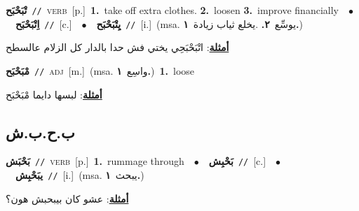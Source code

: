 \documentclass[10pt,a4paper,twoside]{article} %
\begin{document}
\begin{multicols}{2}
{\setlength\topsep{0pt}\textbf{\foreignlanguage{arabic}{تْبَحْبَح}}\ {\color{gray}\texttt{//}\color{black}}\ \textsc{verb}\ [p.]\ \textbf{1.}~take off extra clothes.  \textbf{2.}~loosen  \textbf{3.}~improve financially\ \ $\bullet$\ \ \setlength\topsep{0pt}\textbf{\foreignlanguage{arabic}{اِتْبَحْبَح}}\ {\color{gray}\texttt{//}\color{black}}\ [c.]\ \ $\bullet$\ \ \setlength\topsep{0pt}\textbf{\foreignlanguage{arabic}{يِتْبَحْبَح}}\ {\color{gray}\texttt{//}\color{black}}\ [i.]\ \color{gray}(msa. \foreignlanguage{arabic}{يوسِّع}~\foreignlanguage{arabic}{\textbf{٢.}}  .\foreignlanguage{arabic}{يخلع ثياب زيادة}~\foreignlanguage{arabic}{\textbf{١.}})\color{black}\  \begin{flushright}\color{gray}\foreignlanguage{arabic}{\textbf{\underline{\foreignlanguage{arabic}{أمثلة}}}: اتْبَحْبَحِي يختي فش حدا بالدار كل الزلام عالسطح}\end{flushright}\color{black}} \vspace{2mm}

{\setlength\topsep{0pt}\textbf{\foreignlanguage{arabic}{مْبَحْبَح}}\ {\color{gray}\texttt{//}\color{black}}\ \textsc{adj}\ [m.]\ \color{gray}(msa. \foreignlanguage{arabic}{واسِع}~\foreignlanguage{arabic}{\textbf{١.}})\color{black}\ \textbf{1.}~loose\  \begin{flushright}\color{gray}\foreignlanguage{arabic}{\textbf{\underline{\foreignlanguage{arabic}{أمثلة}}}: لبسها دايما مْبَحْبَح}\end{flushright}\color{black}} \vspace{2mm}

\vspace{-3mm}
\subsection*{\color{blue}\foreignlanguage{arabic}{ب.ح.ب.ش}\color{blue}{}} 

{\setlength\topsep{0pt}\textbf{\foreignlanguage{arabic}{بَحْبَش}}\ {\color{gray}\texttt{//}\color{black}}\ \textsc{verb}\ [p.]\ \textbf{1.}~rummage through\ \ $\bullet$\ \ \setlength\topsep{0pt}\textbf{\foreignlanguage{arabic}{بَحْبِش}}\ {\color{gray}\texttt{//}\color{black}}\ [c.]\ \ $\bullet$\ \ \setlength\topsep{0pt}\textbf{\foreignlanguage{arabic}{يبَحْبِش}}\ {\color{gray}\texttt{//}\color{black}}\ [i.]\ \color{gray}(msa. \foreignlanguage{arabic}{يبحث}~\foreignlanguage{arabic}{\textbf{١.}})\color{black}\  \begin{flushright}\color{gray}\foreignlanguage{arabic}{\textbf{\underline{\foreignlanguage{arabic}{أمثلة}}}: عشو كان بيبحبش هون؟}\end{flushright}\color{black}} \vspace{2mm}


\end{multicols}
\end{document}
